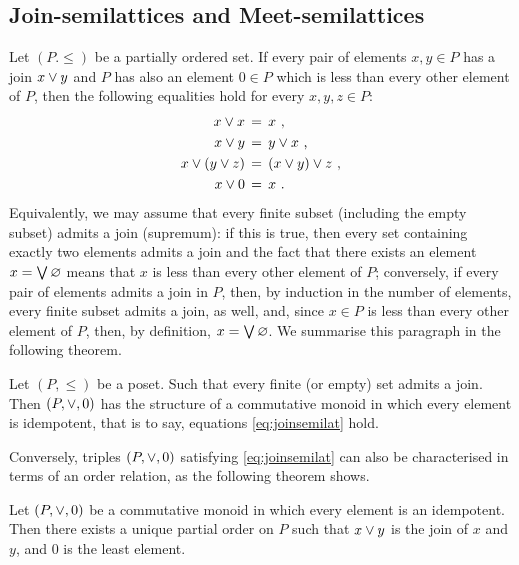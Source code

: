 \subsection{Join-semilattices and Meet-semilattices}
Let $(P.\leq)$ be a partially ordered set. If every pair of elements
$x,y\in P$ has a join $x\vee y$ and $P$ has also an element $0\in P$
which is less than every other element of $P$, then the following equalities
hold for every $x,y,z\in P$:
\begin{align}%
	\label{eq:joinsemilat}
	\begin{split}%
	x\boolsum x & \,=\, x \text{ ,}\\
	x\boolsum y & \,=\, y\boolsum x \text{ ,}\\
	x\boolsum (y\boolsum z) & \,=\, (x\boolsum y)\boolsum z \text{ ,}\\
	x\boolsum 0 & \,=\, x
	\text{ .}
	\end{split}%
\end{align}%
%
Equivalently, we may assume that every finite subset (including the empty
subset) admits a join (supremum): if this is true, then every set containing
exactly two elements admits a join and the fact that there exists an
element $x=\bigvee\varnothing$ means that $x$ is less than every other
element of $P$; conversely, if every pair of elements admits a join in $P$,
then, by induction in the number of elements, every finite subset admits a
join, as well, and, since $x\in P$ is less than every other element of $P$,
then, by definition, $x=\bigvee\varnothing$. We summarise this paragraph
in the following theorem.

\begin{thmJoinSemilat}\label{thm:joinsemilat}
	Let $(P,\leq)$ be a poset. Such that every finite (or empty) set
	admits a join. Then $(P,\vee,0)$ has the structure of a
	commutative monoid in which every element is idempotent, that is to
	say, equations \eqref{eq:joinsemilat} hold.
\end{thmJoinSemilat}

Conversely, triples $(P,\vee,0)$ satisfying \eqref{eq:joinsemilat}
can also be characterised in terms of an order relation, as the following
theorem shows.

\begin{thmJoinSemilatChar}\label{thm:joinsemilatchar}
	Let $(P,\vee,0)$ be a commutative monoid in which every element
	is an idempotent. Then there exists a unique partial order on $P$
	such that $x\vee y$ is the join of $x$ and $y$, and $0$ is the
	least element.
\end{thmJoinSemilatChar}


